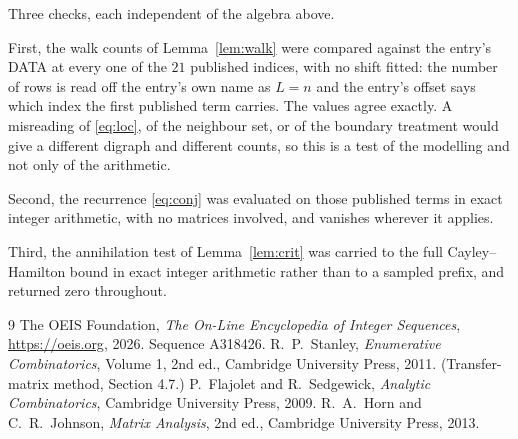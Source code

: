 \documentclass[11pt,a4paper]{article}
\theoremstyle{plain}
\theoremstyle{definition}
\begin{document}
Three checks, each independent of the algebra above.

First, the walk counts of Lemma~\ref{lem:walk} were compared against the entry's DATA at
every one of the $21$ published indices, with no shift fitted: the number of rows is
read off the entry's own name as $L=n$ and the entry's offset says which index the first
published term carries. The values agree exactly. A misreading of \eqref{eq:loc}, of the
neighbour set, or of the boundary treatment would give a different digraph and different
counts, so this is a test of the modelling and not only of the arithmetic.

Second, the recurrence \eqref{eq:conj} was evaluated on those published terms in exact
integer arithmetic, with no matrices involved, and vanishes wherever it applies.

Third, the annihilation test of Lemma~\ref{lem:crit} was carried to the full
Cayley--Hamilton bound in exact integer arithmetic rather than to a sampled prefix, and
returned zero throughout.

\begin{thebibliography}{9}
 The OEIS Foundation, \emph{The On-Line Encyclopedia of Integer
Sequences}, \url{https://oeis.org}, 2026. Sequence A318426.
 R.~P.~Stanley, \emph{Enumerative Combinatorics}, Volume 1, 2nd ed.,
Cambridge University Press, 2011. (Transfer-matrix method, Section 4.7.)
 P.~Flajolet and R.~Sedgewick, \emph{Analytic Combinatorics}, Cambridge
University Press, 2009.
 R.~A.~Horn and C.~R.~Johnson, \emph{Matrix Analysis}, 2nd ed., Cambridge
University Press, 2013.
\end{thebibliography}
\end{document}
